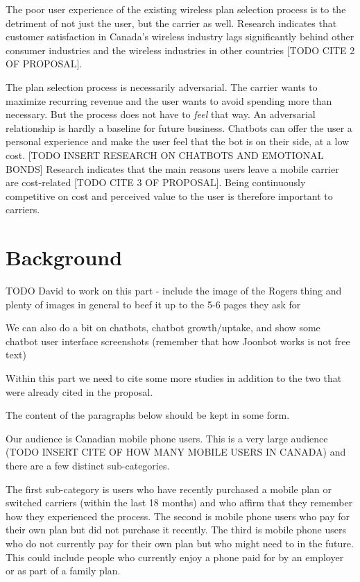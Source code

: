 \documentclass[conference]{IEEEtran}
\begin{document}
The poor user experience of the existing wireless plan selection process is
to the detriment of not just the user, but the carrier as well. Research
indicates that customer satisfaction in Canada's wireless industry lags
significantly behind other consumer industries and the wireless industries in
other countries [TODO CITE 2 OF PROPOSAL].

The plan selection process is necessarily adversarial. The carrier wants to
maximize recurring revenue and the user wants to avoid spending more than
necessary. But the process does not have to \emph{feel} that way. An
adversarial relationship is hardly a baseline for future business. Chatbots
can offer the user a personal experience and make the user feel that the bot
is on their side, at a low cost. [TODO INSERT RESEARCH ON CHATBOTS AND
EMOTIONAL BONDS] Research indicates that the main reasons users leave a
mobile carrier are cost-related [TODO CITE 3 OF PROPOSAL].
Being continuously competitive on cost and perceived value to the user is
therefore important to carriers.

\section{Background}

TODO David to work on this part - include the image of the Rogers thing and
plenty of images in general to beef it up to the 5-6 pages they ask for

We can also do a bit on chatbots, chatbot growth/uptake, and show some
chatbot user interface screenshots (remember that how Joonbot works is
not free text)


Within this part we need to cite some more studies in addition to the two
that were already cited in the proposal.


The content of the paragraphs below should be kept in some form.

Our audience is Canadian mobile phone users. This is a very large audience
(TODO INSERT CITE OF HOW MANY MOBILE USERS IN CANADA) and there are a few
distinct sub-categories.

The first sub-category is users who have recently purchased a mobile plan or
switched carriers (within the last 18 months) and who affirm that they remember
how they experienced the process. The second is mobile phone users who pay for
their own plan but did not purchase it recently. The third is mobile phone users
who do not currently pay for their own plan but who might need to in the future.
This could include people who currently enjoy a phone paid for by an employer or
as part of a family plan.
\end{document}
